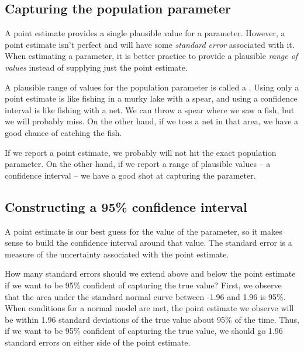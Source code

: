 \subsection{Capturing the population parameter}

A point estimate provides a single plausible value for a parameter. However, a point estimate isn't perfect and will have some \emph{standard error} associated with it. When estimating a parameter,
it is better practice to provide a plausible
\emph{range of values} instead of supplying just the point
estimate.

A plausible range of values for the population parameter is called a . Using only a point estimate is like fishing in a murky lake with a spear, and using a confidence interval is like fishing with a net. We can throw a spear where we saw a fish, but we will probably miss. On the other hand, if we toss a net in that area, we have a good chance of catching the fish.

If we report a point estimate, we probably will not hit the exact population parameter. On the other hand, if we report a range of plausible values -- a confidence interval -- we have a good shot at capturing the parameter.



\subsection{Constructing a 95\% confidence interval}

A point estimate is our best guess for the value of the parameter, so it makes sense to build the confidence interval around that value. The standard error is a measure of the uncertainty associated with the point estimate.  

\begin{examplewrap}
\begin{nexample}{How many standard errors should we extend above and below the point estimate if we want to be 95\% confident of capturing the true value?  }
First, we observe that the area under the standard normal curve between -1.96 and 1.96 is 95\%.  When conditions for a normal model are met, the point estimate we observe will be within 1.96 standard deviations of the true value about 95\% of the time.  Thus, if we want to be 95\% confident of capturing the true value, we should go 1.96 standard errors on either side of the point estimate.
\end{nexample}
\end{examplewrap}

